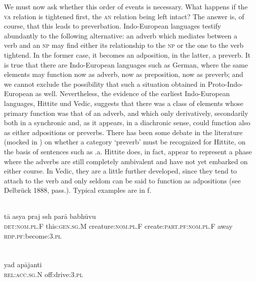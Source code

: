 We must now ask whether this order of events is necessary. What happens if the \textsc{va} relation is tightened first, the \textsc{an} relation being left intact? The answer is, of course, that this leads to preverbation. Indo-European languages testify abundantly to the following alternative: an adverb which mediates between a verb and an \textsc{np} may find either its relationship to the \textsc{np} or the one to the verb tightend. In the former case, it becomes an adposition, in the latter, a preverb. It is true that there are Indo-European languages such as German, where the same elements may function now as adverb, now as preposition, now as preverb; and we cannot exclude the possibility that such a situation obtained in Proto-Indo-European as well. Nevertheless, the evidence of the earliest Indo-European languages, Hittite und Vedic, suggests that there was a class of elements whose primary function was that of an adverb, and which only derivatively, secondarily both in a synchronic and, as it appears, in a diachronic sense, could function also as either adpositions or preverbs. There has been some debate in the literature (mocked in \citealt[127--131]{Starke1977}) on whether a category ‘preverb’ must be recognized for Hittite, on the basis of sentences such as .a. Hittite does, in fact, appear to represent a phase where the adverbs are still completely ambivalent and have not yet embarked on either course.\label{page106} In Vedic, they are a little further developed, since they tend to attach to the verb and only seldom can be said to function as adpositions (see Delbrück 1888, pass.). Typical examples are in f.

\ea\label{ex:E78}
\\
\gll t\=a  asya  praj  ssh par\=a  babh\=uvu  \\
 \textsc{det}:\textsc{nom}.\textsc{pl}.F  this:\textsc{gen}.\textsc{sg}.M  creature:\textsc{nom}.\textsc{pl}.F  create:\textsc{part}.\textsc{pf}:\textsc{nom}.\textsc{pl}.F  away  \textsc{rdp}.\textsc{pf}:become:3.\textsc{pl}  \\
\\
\z
\noindent \ea\label{ex:E79}
 \\
\gll yad  ap\=ajanti  \\
\textsc{rel}:\textsc{acc}.\textsc{sg}.N  off:drive:3.\textsc{pl}  \\
\\
\z 

